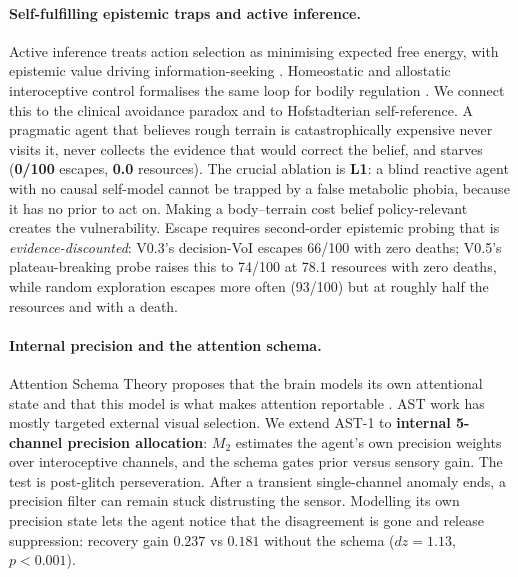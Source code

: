 \documentclass{article}
\begin{document}
\paragraph{Self-fulfilling epistemic traps and active inference.}
Active inference treats action selection as minimising expected free energy, with epistemic value driving information-seeking \citep{friston2015active,tschantz2020learning}. Homeostatic and allostatic interoceptive control formalises the same loop for bodily regulation \citep{tschantz2022simulating}. We connect this to the clinical avoidance paradox and to Hofstadterian self-reference. A pragmatic agent that believes rough terrain is catastrophically expensive never visits it, never collects the evidence that would correct the belief, and starves (\textbf{0/100} escapes, \textbf{0.0} resources). The crucial ablation is \textbf{L1}: a blind reactive agent with no causal self-model cannot be trapped by a false metabolic phobia, because it has no prior to act on. Making a body--terrain cost belief policy-relevant creates the vulnerability. Escape requires second-order epistemic probing that is \emph{evidence-discounted}: V0.3's decision-VoI escapes 66/100 with zero deaths; V0.5's plateau-breaking probe raises this to 74/100 at 78.1 resources with zero deaths, while random exploration escapes more often (93/100) but at roughly half the resources and with a death.

\paragraph{Internal precision and the attention schema.}
Attention Schema Theory proposes that the brain models its own attentional state and that this model is what makes attention reportable \citep{graziano2013consciousness,wilterson2021attention}. AST work has mostly targeted external visual selection. We extend AST-1 to \textbf{internal 5-channel precision allocation}: $M_2$ estimates the agent's own precision weights over interoceptive channels, and the schema gates prior versus sensory gain. The test is post-glitch perseveration. After a transient single-channel anomaly ends, a precision filter can remain stuck distrusting the sensor. Modelling its own precision state lets the agent notice that the disagreement is gone and release suppression: recovery gain $\mathbf{0.237}$ vs $\mathbf{0.181}$ without the schema ($dz=1.13$, $p<0.001$).
\end{document}
